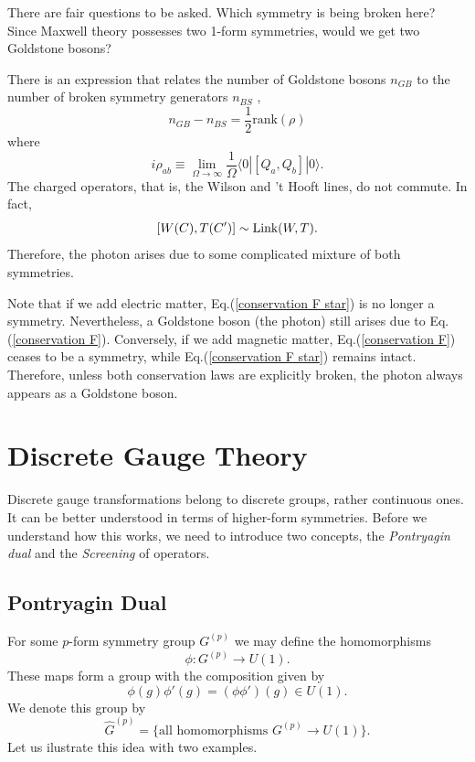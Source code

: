 \documentclass{article}
\begin{document}
There are fair questions to be asked. Which symmetry is being broken here? Since Maxwell theory possesses two 1-form symmetries, would we get two Goldstone bosons? 

There is an expression that relates the number of Goldstone bosons $n_{GB}$ to the number of broken symmetry generators $n_{BS}$ \cite{Watanabe_2011}, 
\begin{equation}
	n_{GB} - n_{BS} = \frac{1}{2}\text{rank}(\rho)
\end{equation}
where 
\begin{equation}
	i\rho_{ab} \equiv \lim_{\Omega\to\infty}\frac{1}{\Omega}\langle 0|[Q_a,Q_b]|0\rangle. 
\end{equation}
The charged operators, that is, the Wilson and 't Hooft lines, do not commute. In fact, 
\begin{equation}
	\comm{W(C)}{T(C')} \sim \text{Link}(W,T). 
\end{equation}
Therefore, the photon arises due to some complicated mixture of both symmetries.

Note that if we add electric matter, Eq.(\ref{conservation F star}) is no longer a symmetry. Nevertheless, a Goldstone boson (the photon) still arises due to Eq.(\ref{conservation F}). Conversely, if we add magnetic matter, Eq.(\ref{conservation F}) ceases to be a symmetry, while Eq.(\ref{conservation F star}) remains intact. Therefore, unless both conservation laws are explicitly broken, the photon always appears as a Goldstone boson.
\section{Discrete Gauge Theory}
Discrete gauge transformations belong to discrete groups, rather continuous ones. It can be better understood in terms of higher-form symmetries. Before we understand how this works, we need to introduce two concepts, the \textit{Pontryagin dual} and the \textit{Screening} of operators. 
\subsection{Pontryagin Dual}
For some $p$-form symmetry group $G^{(p)}$ we may define the homomorphisms
\begin{equation}
	\phi:G^{(p)}\to U(1). 
\end{equation}
These maps form a group with the composition given by
\begin{equation}
	\phi(g)\phi'(g)=(\phi\phi')(g)\in U(1).
\end{equation}
We denote this group by 
\begin{equation}
	\widehat{G}^{(p)}=\{\text{all homomorphisms }G^{(p)}\to U(1) \}.
\end{equation}
Let us ilustrate this idea with two examples. 
\end{document}
